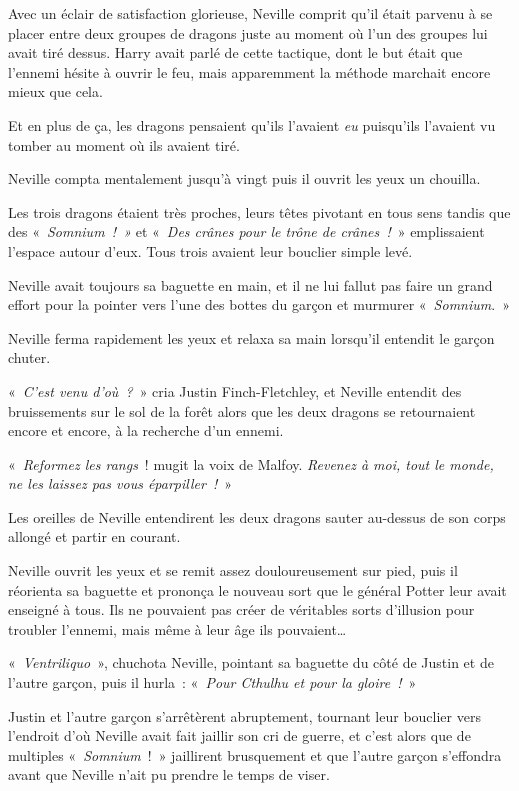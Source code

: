 Avec un éclair de satisfaction glorieuse, Neville comprit qu'il était parvenu à se placer entre deux groupes de dragons juste au moment où l'un des groupes lui avait tiré dessus. Harry avait parlé de cette tactique, dont le but était que l'ennemi hésite à ouvrir le feu, mais apparemment la méthode marchait encore mieux que cela.

Et en plus de ça, les dragons pensaient qu'ils l'avaient \emph{eu} puisqu'ils l'avaient vu tomber au moment où ils avaient tiré.

Neville compta mentalement jusqu'à vingt puis il ouvrit les yeux un chouilla.

Les trois dragons étaient très proches, leurs têtes pivotant en tous sens tandis que des «~\emph{Somnium~!~»} et «~\emph{Des crânes pour le trône de crânes~!}~» emplissaient l'espace autour d'eux. Tous trois avaient leur bouclier simple levé.

Neville avait toujours sa baguette en main, et il ne lui fallut pas faire un grand effort pour la pointer vers l'une des bottes du garçon et murmurer «~\emph{Somnium}.~»

Neville ferma rapidement les yeux et relaxa sa main lorsqu'il entendit le garçon chuter.

«~\emph{C'est venu d'où~?}~» cria Justin Finch-Fletchley, et Neville entendit des bruissements sur le sol de la forêt alors que les deux dragons se retournaient encore et encore, à la recherche d'un ennemi.

«~\emph{Reformez les rangs}~! mugit la voix de Malfoy. \emph{Revenez à moi, tout le monde, ne les laissez pas vous éparpiller~!}~»

Les oreilles de Neville entendirent les deux dragons sauter au-dessus de son corps allongé et partir en courant.

Neville ouvrit les yeux et se remit assez douloureusement sur pied, puis il réorienta sa baguette et prononça le nouveau sort que le général Potter leur avait enseigné à tous. Ils ne pouvaient pas créer de véritables sorts d'illusion pour troubler l'ennemi, mais même à leur âge ils pouvaient…

«~\emph{Ventriliquo}~», chuchota Neville, pointant sa baguette du côté de Justin et de l'autre garçon, puis il hurla~: «~\emph{Pour Cthulhu et pour la gloire~!}~»

Justin et l'autre garçon s'arrêtèrent abruptement, tournant leur bouclier vers l'endroit d'où Neville avait fait jaillir son cri de guerre, et c'est alors que de multiples «~\emph{Somnium}~!~» jaillirent brusquement et que l'autre garçon s'effondra avant que Neville n'ait pu prendre le temps de viser.

